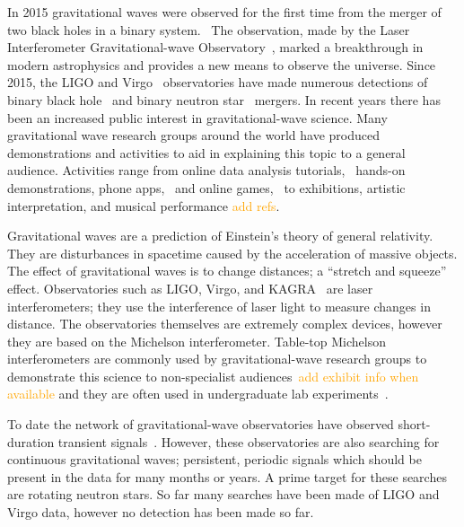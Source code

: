 \documentclass[prb,preprint]{revtex4-1}
\newcommand{\han}{\textcolor{orange}}
\begin{document}
In 2015 gravitational waves were observed for the first time from the merger of two black holes in a binary system.~\cite{GW150914} 
The observation, made by the Laser Interferometer Gravitational-wave Observatory~\citep[LIGO]{AdvancedLIGO:2015}, marked a breakthrough in modern astrophysics and provides a new means to observe the universe. 
Since 2015, the LIGO and Virgo~\cite{AdvancedVirgo:2015} observatories have made numerous detections of binary black hole~\cite{GW151226,GW170104,GW170814} and binary neutron star~\cite{GW170817,GW170817multi,GW190425} mergers. 
In recent years there has been an increased public interest in gravitational-wave science. 
Many gravitational wave research groups around the world have produced demonstrations and activities to aid in explaining this topic to a general audience.
Activities range from online data analysis tutorials,~\cite{GWOSC:online,LOSC:2015} hands-on demonstrations, phone apps,~\cite{LaserLabs:online,SciVR:online} and online games,~\cite{BlackHoleHunter:online} to exhibitions,\cite{L2URSSE} artistic interpretation, and musical performance \han{add refs}. 



Gravitational waves are a prediction of Einstein's theory of general relativity. 
They are disturbances in spacetime caused by the acceleration of massive objects. 
The effect of gravitational waves is to change distances; a ``stretch and squeeze'' effect. 
Observatories such as LIGO, Virgo, and KAGRA~\cite{KAGRA:2013} are laser interferometers; they use the interference of laser light to measure changes in distance. 
The observatories themselves are extremely complex devices, however they are based on the Michelson interferometer. 
Table-top Michelson interferometers are commonly used by gravitational-wave research groups to demonstrate this science to non-specialist audiences~\cite{ThorLabsIFO,NikhefIFO}\han{add exhibit info when available} and they are often used in undergraduate lab experiments~\cite{UgoliniEtAl:2019}. 


To date the network of gravitational-wave observatories have observed short-duration transient signals~\cite{GWTC-1:2018,GWOSC:online}. 
However, these observatories are also searching for continuous gravitational waves; persistent, periodic signals which should be present in the data for many months or years. 
A prime target for these searches are rotating neutron stars. 
So far many searches have been made of LIGO and Virgo data, however no detection has been made so far.
\end{document}
